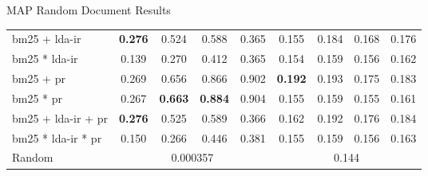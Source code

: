 \begin{frame}{\insertsection}{\insertsubsection}
\begin{block}{MAP Random Document Results}
\begin{table}
{\begin{tabular}{l|c|c|c|c|c|c|c|c}
					\acrshort{bm25} + \acrshort{lda}-\acrshort{ir} & \textbf{0.276} & 0.524 & 0.588 & 0.365 & 0.155 & 0.184 & 0.168 & 0.176 \\
					\acrshort{bm25} * \acrshort{lda}-\acrshort{ir} & 0.139 & 0.270 & 0.412 & 0.365 & 0.154 & 0.159 & 0.156 & 0.162 \\
					\acrshort{bm25} + \acrshort{pr} & 0.269 & 0.656 & 0.866 & 0.902 & \textbf{0.192} & 0.193 & 0.175 & 0.183 \\
					\acrshort{bm25} * \acrshort{pr} & 0.267 & \textbf{0.663} & \textbf{0.884} & 0.904 & 0.155 & 0.159 & 0.155 & 0.161 \\
					\acrshort{bm25} + \acrshort{lda}-\acrshort{ir} + \acrshort{pr} & \textbf{0.276} & 0.525 & 0.589 & 0.366 & 0.162 & 0.192 & 0.176 & 0.184 \\
					\acrshort{bm25} * \acrshort{lda}-\acrshort{ir} * \acrshort{pr} & 0.150 & 0.266 & 0.446 & 0.381 & 0.155 & 0.159 & 0.156 & 0.163 \\
					\rowcolor{red!30}Random & \multicolumn{4}{c|}{0.000357} & \multicolumn{4}{c|}{0.144} \\
				\end{tabular}
			}
		\end{table}
	\end{block}
\end{frame}

